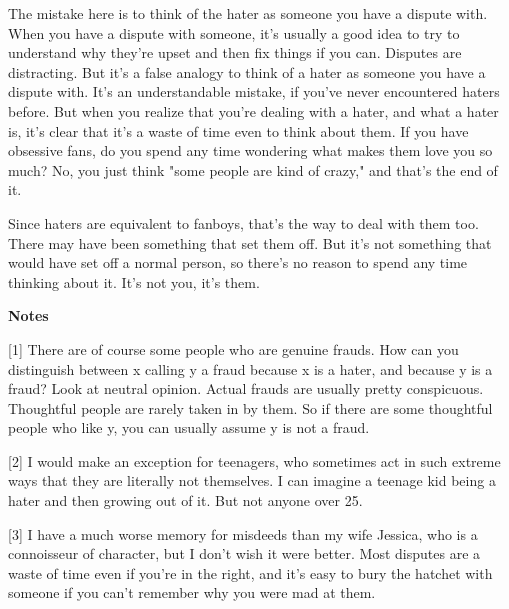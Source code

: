 The mistake here is to think
                  of the hater as someone you have a dispute with. When you have
                  a dispute with someone, it's usually a good idea to try to
                  understand why they're upset and then fix things if you can.
                  Disputes are distracting. But it's a false analogy to think of
                  a hater as someone you have a dispute with. It's an
                  understandable mistake, if you've never encountered haters
                  before. But when you realize that you're dealing with a hater,
                  and what a hater is, it's clear that it's a waste of time even
                  to think about them. If you have obsessive fans, do you spend
                  any time wondering what makes them love you so much? No, you
                  just think "some people are kind of crazy," and that's the end
                  of it.

Since haters are equivalent to fanboys,
                  that's the way to deal with them too. There may have been
                  something that set them off. But it's not something that would
                  have set off a normal person, so there's no reason to spend
                  any time thinking about it. It's not you, it's them.









\textbf{Notes}

[1] There are of course some people who are
                  genuine frauds. How can you distinguish between x calling y a
                  fraud because x is a hater, and because y is a fraud? Look at
                  neutral opinion. Actual frauds are usually pretty conspicuous.
                  Thoughtful people are rarely taken in by them. So if there are
                  some thoughtful people who like y, you can usually assume y is
                  not a fraud.

[2] I would make an exception for
                  teenagers, who sometimes act in such extreme ways that they
                  are literally not themselves. I can imagine a teenage kid
                  being a hater and then growing out of it. But not anyone over
                  25.

[3] I have a much worse memory for misdeeds
                  than my wife Jessica, who is a connoisseur of character, but I
                  don't wish it were better. Most disputes are a waste of time
                  even if you're in the right, and it's easy to bury the hatchet
                  with someone if you can't remember why you were mad at
                  them.

